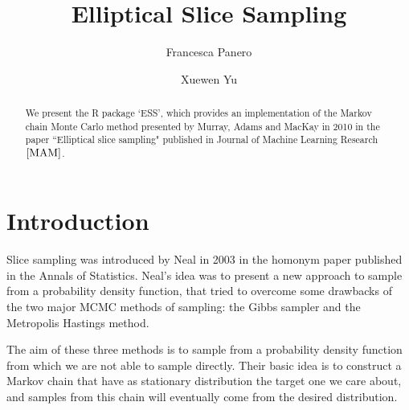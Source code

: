 \documentclass{article}
\title{Elliptical Slice Sampling}
\author{Francesca Panero \and Xuewen Yu}
\begin{document}


\maketitle

\begin{abstract}
We present the R package `ESS', which provides an implementation of the Markov chain Monte Carlo method presented by Murray, Adams and MacKay in 2010 in the paper ``Elliptical slice sampling" published in Journal of Machine Learning Research $\cite{MAM}$.
\end{abstract}

\section{Introduction}

Slice sampling was introduced by Neal in 2003 \cite{Neal2003} in the homonym paper published in the Annals of Statistics. Neal's idea was to present a new approach to sample from a probability density function, that tried to overcome some drawbacks of the two major MCMC methods of sampling: the Gibbs sampler and the Metropolis Hastings method.

The aim of these three methods is to sample from a probability density function from which we are not able to sample directly. Their basic idea is to construct a Markov chain that have as stationary distribution the target one we care about, and samples from this chain will eventually come from the desired distribution. 
\end{document}
